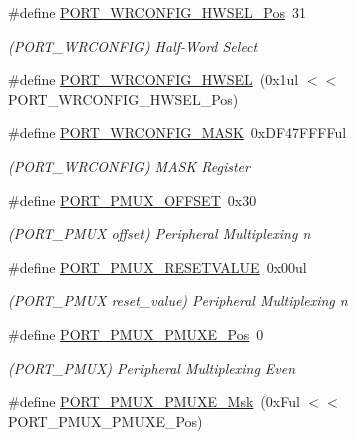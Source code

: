 \begin{DoxyCompactItemize}
\#define \mbox{\hyperlink{group___s_a_m_d21___p_o_r_t_gac3b5f0e8062dcbecbc11d515cbc11dd1}{P\+O\+R\+T\+\_\+\+W\+R\+C\+O\+N\+F\+I\+G\+\_\+\+H\+W\+S\+E\+L\+\_\+\+Pos}}~31
\begin{DoxyCompactList}\small\item\em (P\+O\+R\+T\+\_\+\+W\+R\+C\+O\+N\+F\+IG) Half-\/\+Word Select \end{DoxyCompactList}\item 
\#define \mbox{\hyperlink{group___s_a_m_d21___p_o_r_t_ga4b024ac159d2b916326b97c1db752185}{P\+O\+R\+T\+\_\+\+W\+R\+C\+O\+N\+F\+I\+G\+\_\+\+H\+W\+S\+EL}}~(0x1ul $<$$<$ P\+O\+R\+T\+\_\+\+W\+R\+C\+O\+N\+F\+I\+G\+\_\+\+H\+W\+S\+E\+L\+\_\+\+Pos)
\item 
\#define \mbox{\hyperlink{group___s_a_m_d21___p_o_r_t_ga3d16ca9f7506e69958fe01fcffb6f8fd}{P\+O\+R\+T\+\_\+\+W\+R\+C\+O\+N\+F\+I\+G\+\_\+\+M\+A\+SK}}~0x\+D\+F47\+F\+F\+F\+Ful
\begin{DoxyCompactList}\small\item\em (P\+O\+R\+T\+\_\+\+W\+R\+C\+O\+N\+F\+IG) M\+A\+SK Register \end{DoxyCompactList}\item 
\#define \mbox{\hyperlink{group___s_a_m_d21___p_o_r_t_ga2b2cfb87664f62a60eb5f01a7fbf4e9a}{P\+O\+R\+T\+\_\+\+P\+M\+U\+X\+\_\+\+O\+F\+F\+S\+ET}}~0x30
\begin{DoxyCompactList}\small\item\em (P\+O\+R\+T\+\_\+\+P\+M\+UX offset) Peripheral Multiplexing n \end{DoxyCompactList}\item 
\#define \mbox{\hyperlink{group___s_a_m_d21___p_o_r_t_ga4a150e2f7e2344a8a2f7e3d08ef6c39f}{P\+O\+R\+T\+\_\+\+P\+M\+U\+X\+\_\+\+R\+E\+S\+E\+T\+V\+A\+L\+UE}}~0x00ul
\begin{DoxyCompactList}\small\item\em (P\+O\+R\+T\+\_\+\+P\+M\+UX reset\+\_\+value) Peripheral Multiplexing n \end{DoxyCompactList}\item 
\#define \mbox{\hyperlink{group___s_a_m_d21___p_o_r_t_ga38a4c4871ecabeb4ad36398b73685bac}{P\+O\+R\+T\+\_\+\+P\+M\+U\+X\+\_\+\+P\+M\+U\+X\+E\+\_\+\+Pos}}~0
\begin{DoxyCompactList}\small\item\em (P\+O\+R\+T\+\_\+\+P\+M\+UX) Peripheral Multiplexing Even \end{DoxyCompactList}\item 
\#define \mbox{\hyperlink{group___s_a_m_d21___p_o_r_t_gae955cb77e730b16d702cd0fcdb156ec4}{P\+O\+R\+T\+\_\+\+P\+M\+U\+X\+\_\+\+P\+M\+U\+X\+E\+\_\+\+Msk}}~(0x\+Ful $<$$<$ P\+O\+R\+T\+\_\+\+P\+M\+U\+X\+\_\+\+P\+M\+U\+X\+E\+\_\+\+Pos)

\end{DoxyCompactItemize}

